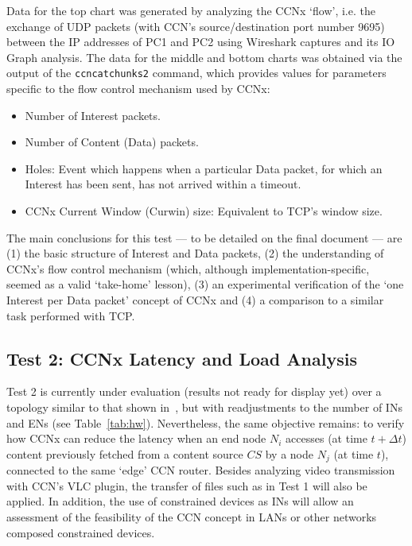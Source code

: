 Data for the top chart was generated by analyzing the CCNx `flow', i.e. the 
exchange of UDP packets (with CCN's source\slash destination port number 9695) 
between the IP addresses of PC1 and PC2 using Wireshark captures and its IO 
Graph analysis. The data for the middle and bottom charts was obtained via the 
output of the \verb+ccncatchunks2+ command, which provides values for 
parameters specific to the flow control mechanism used by CCNx:

\begin{itemize}
    \item Number of Interest packets.
    \item Number of Content (Data) packets.
    \item Holes: Event which happens when a particular Data packet, for which an 
            Interest has been sent, has not arrived within a timeout. 
    \item CCNx Current Window (Curwin) size: Equivalent to TCP's window size.
\end{itemize}

The main conclusions for this test --- to be detailed on the final 
document --- are (1) the basic structure of Interest and Data packets, 
(2) the understanding of CCNx's flow control mechanism 
(which, although implementation-specific, seemed as a valid `take-home' 
lesson), (3) an experimental verification of the `one Interest per Data 
packet' concept of CCNx and (4) a comparison to a similar task performed with 
TCP.\vertbreak

\subsection{Test 2: CCNx Latency and Load Analysis}
\label{subsec:ccn-lat-load}

Test 2 is currently under evaluation (results not ready for display yet) over 
a topology similar to that shown in~\cite{Rodrigues2013b}, but with readjustments to the number 
of INs and ENs (see Table~\ref{tab:hw}). Nevertheless, the same objective remains: to 
verify how CCNx can reduce the latency when an end node $N_i$ accesses (at time 
$t + \Delta t$) content 
previously fetched from a content source $CS$ by a node $N_j$ (at time $t$), 
connected to 
the same `edge' CCN router. Besides analyzing video transmission with CCN's VLC 
plugin, the transfer of files such as in Test 1 will also be applied. In 
addition, the use of constrained devices as INs 
will allow an assessment of the feasibility of the CCN concept in LANs or other 
networks composed constrained devices.\vertbreak

